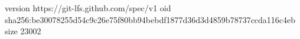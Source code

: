 version https://git-lfs.github.com/spec/v1
oid sha256:be30078255d54c9c26e75f80bb94bebdf1877d36d3d4859b78737ccda116c4eb
size 23002
